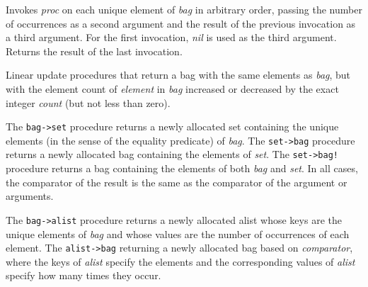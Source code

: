 \begin{entry}{%
  }

  Invokes \emph{proc} on each unique element of \emph{bag} in
  arbitrary order, passing the number of occurrences as a second
  argument and the result of the previous invocation as a third
  argument. For the first invocation, \emph{nil} is used as the third
  argument. Returns the result of the last invocation.
\end{entry}

\begin{entry}{%
  }

  Linear update procedures that return a bag with the same elements as
  \emph{bag}, but with the element count of \emph{element} in
  \emph{bag} increased or decreased by the exact integer \emph{count}
  (but not less than zero).
\end{entry}

\begin{entry}{%
  }

  The \texttt{bag-\textgreater{}set} procedure returns a newly
  allocated set containing the unique elements (in the sense of the
  equality predicate) of \emph{bag}. The
  \texttt{set-\textgreater{}bag} procedure returns a newly allocated
  bag containing the elements of \emph{set}. The
  \texttt{set-\textgreater{}bag!} procedure returns a bag containing
  the elements of both \emph{bag} and \emph{set}. In all cases, the
  comparator of the result is the same as the comparator of the
  argument or arguments.
\end{entry}

\begin{entry}{%
  }

  The \texttt{bag-\textgreater{}alist} procedure returns a newly
  allocated alist whose keys are the unique elements of \emph{bag} and
  whose values are the number of occurrences of each element. The
  \texttt{alist-\textgreater{}bag} returning a newly allocated bag
  based on \emph{comparator}, where the keys of \emph{alist} specify
  the elements and the corresponding values of \emph{alist} specify
  how many times they occur.
\end{entry}

